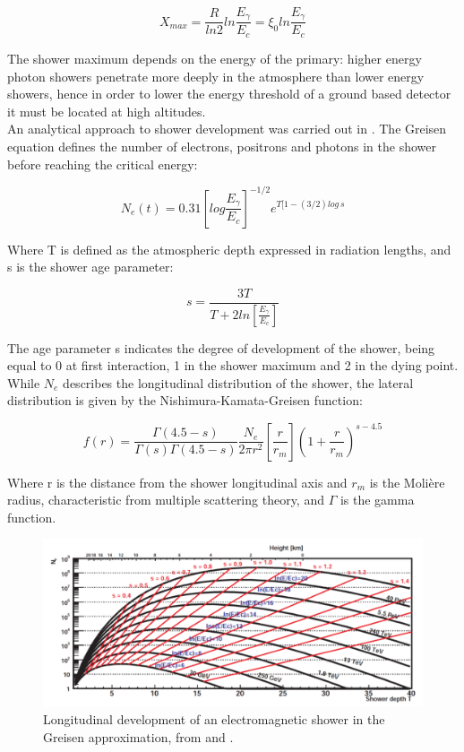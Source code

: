 \documentclass[main.tex]{subfiles}
\begin{document}
\begin{equation} \label{eq:xmax}
    X_{max} = \frac{R}{ln 2} ln \frac{E_{\gamma}}{E_c} = \xi_0 ln \frac{E_{\gamma}}{E_c}
\end{equation}

The shower maximum depends on the energy of the primary: higher energy photon showers penetrate more deeply in the atmosphere than lower energy showers, hence in order to lower the energy threshold of a ground based detector it must be located at high altitudes.\\
An analytical approach to shower development was carried out in \cite{RossiGreisenCR}. The Greisen equation defines the number of electrons, positrons and photons in the shower before reaching the critical energy:

\begin{equation}
    N_{e}(t) = 0.31 \left[log \frac{E_{\gamma}}{E_{c}}\right]^{-1/2} e^{T[1-(3/2)log\,s}
\end{equation}

Where T is defined as the atmospheric depth expressed in radiation lengths, and s is the shower age parameter:

\begin{equation}
    s = \frac{3T}{T+2ln \left[\frac{E_{\gamma}}{E_c}\right]}
\end{equation}

The age parameter s indicates the degree of development of the shower, being equal to 0  at first interaction, 1 in the shower maximum and 2 in the dying point. \\
While $N_{e}$ describes the longitudinal distribution of the shower, the lateral distribution is given by the Nishimura-Kamata-Greisen function: 

\begin{equation}
    f(r) = \frac{\Gamma(4.5-s)}{\Gamma(s)\Gamma(4.5-s)} \frac{N_e}{2\pi r^2}\left[\frac{r}{r_m} \right] \left( 1+\frac{r}{r_m} \right)^{s-4.5}
\end{equation}

Where r is the distance from the shower longitudinal axis and $r_{m}$ is the Molière radius, characteristic from multiple scattering theory,  and $\Gamma$ is the gamma function. 

\begin{figure}
    \centering
    \includegraphics[width=1\textwidth]{Pictures/showerdevelop.pdf}
    \caption{Longitudinal development of an electromagnetic shower in the Greisen approximation, from \cite{IOyaThesis} and \cite{TarekThesis}.}
    \label{fig:showeredel}
\end{figure}
\end{document}
